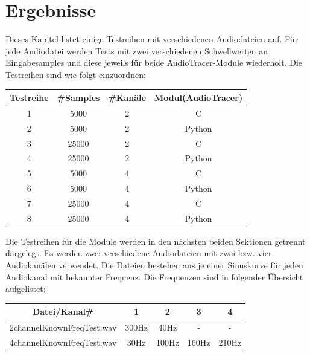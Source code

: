 
\section{Ergebnisse} \label{audiotracer_results}
Dieses Kapitel listet einige Testreihen mit verschiedenen Audiodateien auf. Für jede Audiodatei werden Tests mit zwei verschiedenen Schwellwerten an Eingabesamples und diese jeweils für beide AudioTracer-Module wiederholt.
Die Testreihen sind wie folgt einzuordnen:
\begin{table}[h!]
	\centering
	\begin{tabular}{|c | c | c | c|}
		\hline
		Testreihe & \#Samples & \#Kanäle & Modul(AudioTracer)\\
		\hline\hline
		1		&	5000	&	2	&	C \\
		2		&	5000	&	2	&	Python \\
		3		&	25000	&	2	&	C \\
		4		&	25000	&	2	&	Python \\
		5		&	5000	&	4	&	C \\
		6		&	5000	&	4	&	Python \\
		7		&	25000	&	4	&	C \\												
		8		&	25000	&	4	&	Python \\
		\hline	
		
	\end{tabular}	
\end{table}

Die Testreihen für die Module werden in den nächsten beiden Sektionen getrennt dargelegt.
Es werden zwei verschiedene Audiodateien mit zwei bzw. vier Audiokanälen verwendet.
Die Dateien bestehen aus je einer Sinuskurve für jeden Audiokanal mit bekannter Frequenz. Die Frequenzen sind in folgender Übersicht aufgelistet:

\begin{table}[h!]
	\centering
	\begin{tabular}{|c | c | c | c | c |}		
		\hline
		Datei/Kanal\# & 1 & 2 & 3 & 4\\
		\hline\hline
		2channelKnownFreqTest.wav		&	300Hz & 40Hz & - & - \\
		4channelKnownFreqTest.wav		&	30Hz  &	100Hz	&	160Hz & 210Hz \\
		\hline	
		
	\end{tabular}	
\end{table}

\newpage

